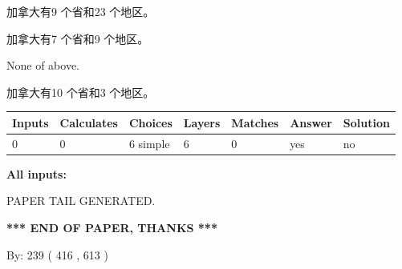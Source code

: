 \documentclass{ctexart}
\begin{document}
 
加拿大有9 个省和23 个地区。
 
 
加拿大有7 个省和9 个地区。
 
 
 None of above.
 
 
\noindent{}
 
 
加拿大有10 个省和3 个地区。
 
 
\noindent{}
 
 
   
   
   
   
\noindent\begin{tabular}{|l|l|l|l|l|l|l|}
 \hline
Inputs & Calculates & Choices & Layers & Matches & Answer & Solution \\ \hline
 0  & 
 0  & 
 6
  simple  
  & 
 6  & 
 0  & 
  yes & 
  no 
  \\ \hline
 \end{tabular}
   
   
   
   
\noindent{}
   
   
   
   
\noindent\vspace{0.1in}\hspace{-0.08in} {\textbf{\Large{All inputs: }}}
   
   
   
   
   
   
 \vspace{0.2in}
 
   
   
\vspace{2.0in} PAPER TAIL GENERATED.
   
   
   
   
\vspace{1.0in} 
{\textbf{\large{ *** END OF PAPER, THANKS *** }}} 
   
   
\hspace{1.0in} By: 
 239 ( 416 ,  613 )
   
   
   
   
\newpage 
\setcounter{page}{ 
   609001 } 
   
   
   
\end{document}
